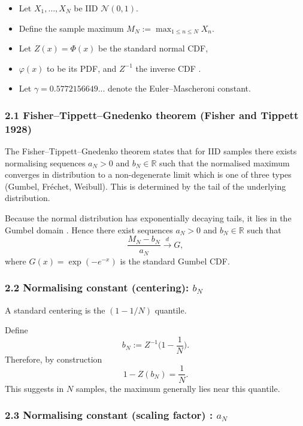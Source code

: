 \documentclass[
  12pt,
]{article}
\begin{document}
\begin{itemize}
\item
  Let \(X_1,\dots,X_N\) be IID \(\mathcal{N}(0,1)\).
\item
  Define the sample maximum \(M_N := \max_{1\le n\le N} X_n.\)
\item
  Let \(Z(x)=\Phi(x)\) be the standard normal CDF,
\item
  \(\varphi(x)\) to be its PDF, and \(Z^{-1}\) the inverse CDF .
\item
  Let \(\gamma= 0.5772156649...\) denote the Euler--Mascheroni constant.
\end{itemize}

\subsubsection{2.1 Fisher--Tippett--Gnedenko theorem (Fisher and Tippett
1928)}\label{fishertippettgnedenko-theorem-fisher1928}

The Fisher--Tippett--Gnedenko theorem states that for IID samples there
exists normalising sequences \(a_N>0\) and \(b_N\in\mathbb{R}\) such
that the normalised maximum converges in distribution to a
non-degenerate limit which is one of three types (Gumbel, Fréchet,
Weibull). This is determined by the tail of the underlying distribution.

Because the normal distribution has exponentially decaying tails, it
lies in the Gumbel domain . Hence there exist sequences \(a_N>0\) and
\(b_N\in\mathbb{R}\) such that \[
\frac{M_N - b_N}{a_N} \xrightarrow{d} G \tag{1},
\] where \(G(x)=\exp(-e^{-x})\) is the standard Gumbel CDF.

\subsubsection{\texorpdfstring{2.2 Normalising constant (centering):
\(b_N\)}{2.2 Normalising constant (centering): b\_N}}\label{normalising-constant-centering-b_n}

A standard centering is the \((1-1/N)\) quantile.

Define \[
b_N := Z^{-1}\!\Big(1-\frac{1}{N}\Big) \tag{2}.
\] Therefore, by construction\[
1 - Z(b_N) = \frac{1}{N} \tag{3}.
\] This suggests in \(N\) samples, the maximum generally lies near this
quantile.

\subsubsection{\texorpdfstring{2.3 Normalising constant (scaling factor)
:
\(a_N\)}{2.3 Normalising constant (scaling factor) : a\_N}}\label{normalising-constant-scaling-factor-a_n}
\end{document}
